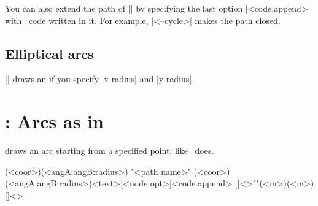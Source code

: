 You can also extend the path of |\tzarc| by specifying the last option |<code.append>| with \Tikz\ code written in it. For example, |<--cycle>| makes the path closed.


\begin{tzcode}{.3}
\end{tzcode}



\subsection{Elliptical arcs}
\label{ss:ellipticalarc}

|\tzarc| draws an  if you specify |x-radius| and |y-radius|.

\begin{tzcode}{.3}
\end{tzcode}


\begin{tzcode}{.3}
\end{tzcode}




\section{\protect{}: Arcs as in \Tikz}
\label{s:tzarcfrom}

\icmd{\tzarcfrom} draws an arc starting from a specified point, like \Tikz\ does.

\begin{tzdef}
\tzarcfrom(<coor>)(<angA:angB:radius>)
"<path name>"
      (<coor>)(<angA:angB:radius>){<text>}[<node opt>]<code.append>
  []<>""(<m>)(<m>){}[]<>
\end{tzdef}



